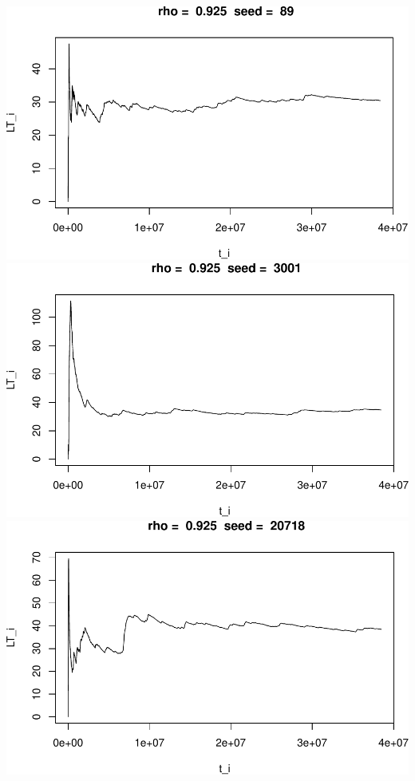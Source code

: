 \documentclass[]{article}
\begin{document}
\includegraphics{003_files/figure-latex/unnamed-chunk-22-7.pdf}
\includegraphics{003_files/figure-latex/unnamed-chunk-22-8.pdf}
\includegraphics{003_files/figure-latex/unnamed-chunk-22-9.pdf}
\end{document}
